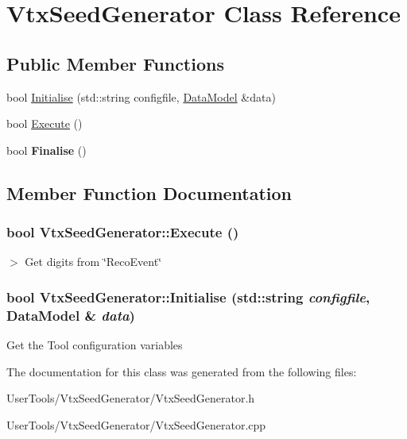 \hypertarget{classVtxSeedGenerator}{
\section{VtxSeedGenerator Class Reference}
\label{classVtxSeedGenerator}
}
\subsection*{Public Member Functions}
\begin{DoxyCompactItemize}
\item 
bool \hyperlink{classVtxSeedGenerator_aa07a4e52d01bb171fc07b12027369dab}{Initialise} (std::string configfile, \hyperlink{classDataModel}{DataModel} \&data)
\item 
bool \hyperlink{classVtxSeedGenerator_a72ef5546d469ec83191fa13737cfa4ed}{Execute} ()
\item 
\hypertarget{classVtxSeedGenerator_a4460b85304ae3a2bc8dbb81c155daac5}{
bool {\bfseries Finalise} ()}
\label{classVtxSeedGenerator_a4460b85304ae3a2bc8dbb81c155daac5}

\end{DoxyCompactItemize}


\subsection{Member Function Documentation}
\hypertarget{classVtxSeedGenerator_a72ef5546d469ec83191fa13737cfa4ed}{
\subsubsection[{Execute}]{\setlength{\rightskip}{0pt plus 5cm}bool VtxSeedGenerator::Execute ()}}
\label{classVtxSeedGenerator_a72ef5546d469ec83191fa13737cfa4ed}


$>$ Get digits from \char`\"{}RecoEvent\char`\"{} \hypertarget{classVtxSeedGenerator_aa07a4e52d01bb171fc07b12027369dab}{
\subsubsection[{Initialise}]{\setlength{\rightskip}{0pt plus 5cm}bool VtxSeedGenerator::Initialise (std::string {\em configfile}, \/  {\bf DataModel} \& {\em data})}}
\label{classVtxSeedGenerator_aa07a4e52d01bb171fc07b12027369dab}


Get the Tool configuration variables 

The documentation for this class was generated from the following files:\begin{DoxyCompactItemize}
\item 
UserTools/VtxSeedGenerator/VtxSeedGenerator.h\item 
UserTools/VtxSeedGenerator/VtxSeedGenerator.cpp\end{DoxyCompactItemize}
